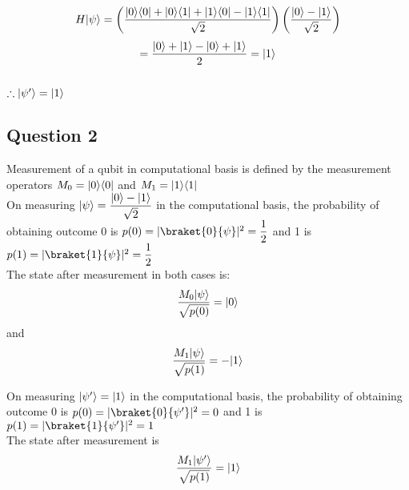 \documentclass{article}
\DeclarePairedDelimiter\bra{\langle}{\rvert}
\DeclarePairedDelimiter\ket{\lvert}{\rangle}
\begin{document}
\noindent
\[H\ket{\psi} = \left(\dfrac{\ket{0}\bra{0}+ \ket{0}\bra{1}+\ket{1}\bra{0} - \ket{1}\bra{1}}{\sqrt{2}}\right) \left(\dfrac{\ket{0}-\ket{1}}{\sqrt{2}}\right) \]
\[= \dfrac{\ket{0}+\ket{1}-\ket{0}+\ket{1}}{2} = \ket{1}\] \\

\noindent
$\therefore  \ket{\psi^{\prime}} = \ket{1}$

\subsection{Question 2}
Measurement of a qubit in computational basis is defined by the measurement operators $M_0 = \ket{0}\bra{0}$ and $M_1 =\ket{1}\bra{1}$\\

\noindent
On measuring $\ket{\psi} = \dfrac{\ket{0}-\ket{1}}{\sqrt{2}}$ in the computational basis, the probability of obtaining outcome 0 is $p(0)= |\braket{0}{\psi}|^2 = \dfrac{1}{2}$ and 1 is $p(1)= |\braket{1}{\psi}|^2 = \dfrac{1}{2}$\\

\noindent
The state after measurement in both cases is:\\
\[ \dfrac{M_0 \ket{\psi}}{\sqrt{p(0)}} = \ket{0}\] and \[ \dfrac{M_1 \ket{\psi}}{\sqrt{p(1)}} = -\ket{1}\]

\noindent
On measuring $\ket{\psi^{\prime}} = \ket{1}$ in the computational basis, the probability of obtaining outcome 0 is $p(0)= |\braket{0}{\psi^{\prime}}|^2 = 0$ and 1 is $p(1)= |\braket{1}{\psi^{\prime}}|^2 = 1$\\

\noindent
The state after measurement is  \[ \dfrac{M_1 \ket{\psi^{\prime}}}{\sqrt{p(1)}} = \ket{1}\]
\end{document}
